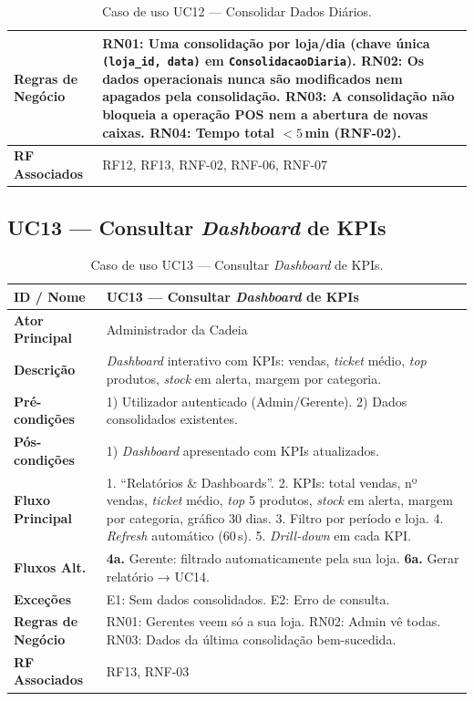 \documentclass[a4paper,12pt]{scrreprt}
\begin{document}
\begin{table}[H]
\begin{tabular}{|p{3cm}|p{11cm}|}
\hline
\textbf{Regras de Negócio} & RN01: Uma consolidação por loja/dia (chave única \texttt{(loja\_id, data)} em \texttt{ConsolidacaoDiaria}). RN02: Os dados operacionais nunca são modificados nem apagados pela consolidação. RN03: A consolidação não bloqueia a operação POS nem a abertura de novas caixas. RN04: Tempo total $< 5$\,min (RNF-02). \\
\hline
\textbf{RF Associados} & RF12, RF13, RNF-02, RNF-06, RNF-07 \\
\hline
\end{tabular}
\caption{Caso de uso UC12 --- Consolidar Dados Diários.}
\end{table}

\subsection*{UC13 --- Consultar \textit{Dashboard} de KPIs}
\begin{table}[H]
\centering\small
\begin{tabular}{|p{3cm}|p{11cm}|}
\hline
\textbf{ID / Nome} & UC13 --- Consultar \textit{Dashboard} de KPIs \\
\hline
\textbf{Ator Principal} & Administrador da Cadeia \\
\hline
\textbf{Descrição} & \textit{Dashboard} interativo com KPIs: vendas, \textit{ticket} médio, \textit{top} produtos, \textit{stock} em alerta, margem por categoria. \\
\hline
\textbf{Pré-condições} & 1) Utilizador autenticado (Admin/Gerente). 2) Dados consolidados existentes. \\
\hline
\textbf{Pós-condições} & 1) \textit{Dashboard} apresentado com KPIs atualizados. \\
\hline
\textbf{Fluxo Principal} & 1. ``Relatórios \& Dashboards''. 2. KPIs: total vendas, nº vendas, \textit{ticket} médio, \textit{top} 5 produtos, \textit{stock} em alerta, margem por categoria, gráfico 30 dias. 3. Filtro por período e loja. 4. \textit{Refresh} automático (60\,s). 5. \textit{Drill-down} em cada KPI. \\
\hline
\textbf{Fluxos Alt.} & \textbf{4a.} Gerente: filtrado automaticamente pela sua loja. \textbf{6a.} Gerar relatório → UC14. \\
\hline
\textbf{Exceções} & E1: Sem dados consolidados. E2: Erro de consulta. \\
\hline
\textbf{Regras de Negócio} & RN01: Gerentes veem só a sua loja. RN02: Admin vê todas. RN03: Dados da última consolidação bem-sucedida. \\
\hline
\textbf{RF Associados} & RF13, RNF-03 \\
\hline
\end{tabular}
\caption{Caso de uso UC13 --- Consultar \textit{Dashboard} de KPIs.}
\end{table}
\end{document}
